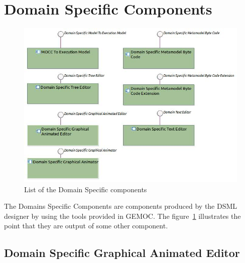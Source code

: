 \documentclass{gemoc} %
\begin{document}
\section{Domain Specific Components}
\begin{figure}[htp]
	\begin{center}
	\includegraphics*[trim=0.0cm 0.0cm 0cm 0.0cm, clip=true, width=1.0\linewidth]{../images/DomainSpecificComponents.jpg}
	\caption{List of the Domain Specific components}
	\label{fig:DomainSpecificComponentList}
	\end{center}
\end{figure}
The Domains Specific Components are components produced by the DSML designer by using the tools provided in GEMOC. The figure~\ref{fig:DomainSpecificComponentList} illustrates the point that they are output of some other component.
\subsection{Domain Specific Graphical Animated Editor}
\label{sec:Domain_Specific_Graphical_Animated_Editor}
\end{document}
